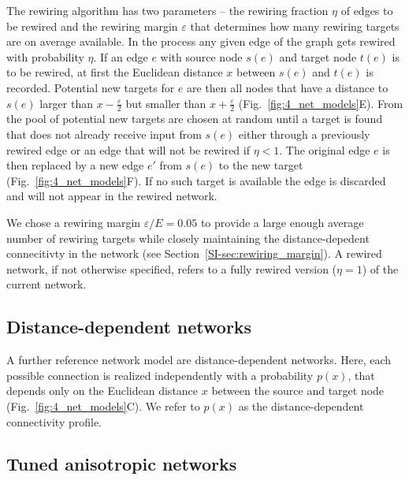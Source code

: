 The rewiring algorithm has two parameters -- the rewiring fraction
$\eta$ of edges to be rewired and the rewiring margin $\varepsilon$
that determines how many rewiring targets are on average available. In
the process any given edge of the graph gets rewired with probability
$\eta$. If an edge $e$ with source node $s(e)$ and target node $t(e)$
is to be rewired, at first the Euclidean distance $x$ between $s(e)$
and $t(e)$ is recorded. Potential new targets for $e$ are then all
nodes that have a distance to $s(e)$ larger than
$x-\frac{\varepsilon}{2}$ but smaller than $x+\frac{\varepsilon}{2}$
(Fig.~\ref{fig:4_net_models}E). From the pool of potential new targets
are chosen at random until a target is found that does not already
receive input from $s(e)$ either through a previously rewired edge or
an edge that will not be rewired if $\eta <1$. The original edge $e$
is then replaced by a new edge $e'$ from $s(e)$ to the new target
(Fig.~\ref{fig:4_net_models}F). If no such target is available the
edge is discarded and will not appear in the rewired network.

We chose a rewiring margin $\varepsilon / E = 0.05$ to provide a large
enough average number of rewiring targets while closely maintaining
the distance-depedent connecitivty in the network (see
Section~\ref{SI-sec:rewiring_margin}). A rewired network, if not
otherwise specified, refers to a fully rewired version ($\eta=1$) of
the current network. 






\subsection*{Distance-dependent networks}

A further reference network model are distance-dependent
networks. Here, each possible connection is realized independently
with a probability $p(x)$, that depends only on the Euclidean distance
$x$ between the source and target node
(Fig.~\ref{fig:4_net_models}C). We refer to $p(x)$ as the
distance-dependent connectivity profile. 



\subsection*{Tuned anisotropic networks}

